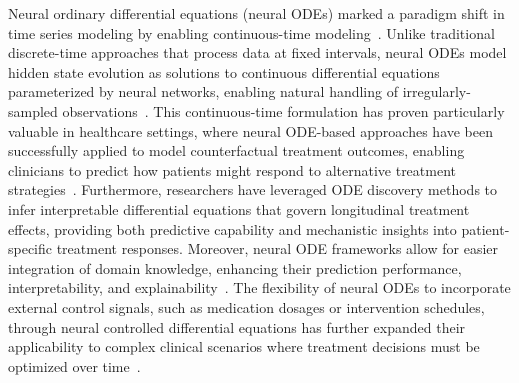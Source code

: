\documentclass[preprint,12pt]{elsarticle}
\begin{document}
Neural ordinary differential equations (neural ODEs) marked a paradigm shift in time series modeling by enabling continuous-time modeling~\citep{chen2018neural}. Unlike traditional discrete-time approaches that process data at fixed intervals, neural ODEs model hidden state evolution as solutions to continuous differential equations parameterized by neural networks, enabling natural handling of irregularly-sampled observations~\citep{rubanova2019latent}. This continuous-time formulation has proven particularly valuable in healthcare settings, where neural ODE-based approaches have been successfully applied to model counterfactual treatment outcomes, enabling clinicians to predict how patients might respond to alternative treatment strategies~\citep{seedat2022continuous}. Furthermore, researchers have leveraged ODE discovery methods to infer interpretable differential equations that govern longitudinal treatment effects, providing both predictive capability and mechanistic insights into patient-specific treatment responses. Moreover, neural ODE frameworks allow for easier integration of domain knowledge, enhancing their prediction performance, interpretability, and explainability~\citep{kacprzyk2024ode}. The flexibility of neural ODEs to incorporate external control signals, such as medication dosages or intervention schedules, through neural controlled differential equations has further expanded their applicability to complex clinical scenarios where treatment decisions must be optimized over time~\citep{kidger2020neural}.
\end{document}

